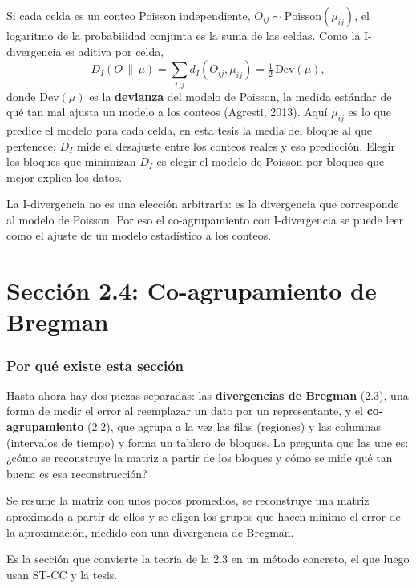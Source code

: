 \documentclass[11pt,a4paper]{article}
\newenvironment{idea}{\par\begin{center}\begin{lrbox}{\ideabox}\begin{minipage}{0.9\linewidth}}{\end{minipage}\end{lrbox}\fcolorbox{blue!40!black}{blue!5}{\usebox{\ideabox}}\end{center}}
\begin{document}
Si cada celda es un conteo Poisson independiente, $O_{ij}\sim\mathrm{Poisson}(\mu_{ij})$,
el logaritmo de la probabilidad conjunta es la suma de las celdas. Como la
I-divergencia es aditiva por celda,
\[
  D_I(O\,\|\,\mu)=\sum_{i,j}d_I(O_{ij},\mu_{ij})=\tfrac12\,\mathrm{Dev}(\mu),
\]
donde $\mathrm{Dev}(\mu)$ es la \textbf{devianza} del modelo de Poisson, la medida
estándar de qué tan mal ajusta un modelo a los conteos (Agresti, 2013). Aquí
$\mu_{ij}$ es lo que predice el modelo para cada celda, en esta tesis la media del
bloque al que pertenece; $D_I$ mide el desajuste entre los conteos reales y esa
predicción. Elegir los bloques que minimizan $D_I$ es elegir el modelo de Poisson
por bloques que mejor explica los datos.

\begin{idea}
La I-divergencia no es una elección arbitraria: es la divergencia que corresponde
al modelo de Poisson. Por eso el co-agrupamiento con I-divergencia se puede leer
como el ajuste de un modelo estadístico a los conteos.
\end{idea}

\part{Sección 2.4: Co-agrupamiento de Bregman}

\section{Por qué existe esta sección}

Hasta ahora hay dos piezas separadas: las \textbf{divergencias de Bregman} (2.3),
una forma de medir el error al reemplazar un dato por un representante, y el
\textbf{co-agrupamiento} (2.2), que agrupa a la vez las filas (regiones) y las
columnas (intervalos de tiempo) y forma un tablero de bloques. La pregunta que las
une es: ¿cómo se reconstruye la matriz a partir de los bloques y cómo se mide qué
tan buena es esa reconstrucción?

\begin{idea}
Se resume la matriz con unos pocos promedios, se reconstruye una matriz aproximada
a partir de ellos y se eligen los grupos que hacen mínimo el error de la
aproximación, medido con una divergencia de Bregman.
\end{idea}

Es la sección que convierte la teoría de la 2.3 en un método concreto, el que luego
usan ST-CC y la tesis.
\end{document}
